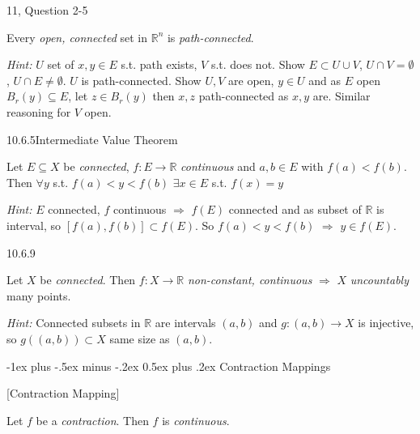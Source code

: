 \documentclass[10pt]{article} %
\makeatletter
\newcommand{\cws}[2]{#1, Question #2}
\newcommand{\Hint}{\vspace{0.2em}\textit{Hint: }}
\renewcommand{\section}{\@startsection{section}{1}{0mm}%
                                {-1ex plus -.5ex minus -.2ex}%
                                {0.5ex plus .2ex}%
                                {\normalfont\large\bfseries}}
\makeatother
\begin{document}
\begin{multicols}{3}
\begin{workshop}{\cws{11}{2-5}}{}

    Every \emph{open, connected} set in $\mathbb{R}^n$ is \emph{path-connected}.

    \Hint $U$ set of $x,y \in E$ s.t. path exists, $V$ s.t. does not. Show $E \subset U \cup V$, $U \cap V = \emptyset$, $U \cap E \neq \emptyset$. $U$ is path-connected. Show $U,V$ are open, $y \in U$ and as $E$ open $B_r(y) \subseteq E$, let $z \in B_r(y)$ then $x,z$ path-connected as $x,y$ are. Similar reasoning for $V$ open.

\end{workshop}

\begin{exercise}{10.6.5}{Intermediate Value Theorem}

    Let $E \subseteq X$ be \emph{connected}, $f: E \to \mathbb{R}$ \emph{continuous} and $a,b \in E$ with $f(a) < f(b)$. Then $\forall y$ s.t. $f(a) < y < f(b)$ $\exists x \in E$ s.t. $f(x) = y$

    \Hint $E$ connected, $f$ continuous $\Rightarrow$ $f(E)$ connected and as subset of $\mathbb{R}$ is interval, so $[f(a),f(b)] \subset f(E)$. So $f(a) < y < f(b)$ $\Rightarrow$ $y \in f(E)$.

\end{exercise}

\begin{exercise}{10.6.9}{}

    Let $X$ be \emph{connected}. Then $f: X \to \mathbb{R}$ \emph{non-constant, continuous} $\Rightarrow$ $X$ \emph{uncountably} many points.

    \Hint Connected subsets in $\mathbb{R}$ are intervals $(a,b)$ and $g: (a,b) \to X$ is injective, so $g((a,b)) \subset X$ same size as $(a,b)$.

\end{exercise}


\section{Contraction Mappings}

\begin{exercise}{[Contraction Mapping]}{}

    Let $f$ be a \emph{contraction}. Then $f$ is \emph{continuous}.


\end{exercise}
\end{multicols}
\end{document}
